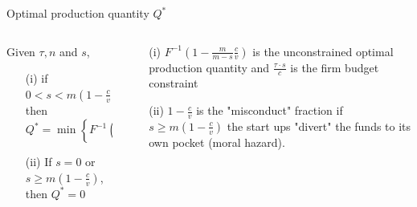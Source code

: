\documentclass{beamer}
\begin{document}
\begin{frame}{Optimal production quantity $Q^\ast$}
\scriptsize
\begin{columns}
\begin{column}{0.5\textwidth}
\begin{tcolorbox}[enhanced,drop shadow, title=Proposition ]
Given $\tau , n $ and $s$, 
\begin{itemize}
  \item[(i)] if $0<s < m\left(1-\frac{c}{v}\right)$ then 
  $$
  Q^{\ast} = \min\left\{F^{-1}\left(1-\frac{m}{m-s}\frac{c}{v}\right), \frac{\tau \cdot s}{c}\right\}
  $$ 
  \item[(ii)] If $s = 0$ or $s\geq m\left(1-\frac{c}{v}\right)$, then $Q^\ast = 0$
\end{itemize}
\end{tcolorbox}
\end{column}
\begin{column}{0.5\textwidth}
\begin{tcolorbox}[enhanced,drop shadow, title=Interpretation ]
\begin{itemize}
  \item[(i)]  $F^{-1}\left(1-\frac{m}{m-s}\frac{c}{v}\right)$ is the unconstrained optimal production quantity and $\frac{\tau \cdot s}{c}$ is the firm budget constraint 

  \item[(ii)] $1-\frac{c}{v}$ is the "misconduct" fraction if $s\geq m\left(1-\frac{c}{v}\right)$  
  the start ups "divert" the funds to its own pocket (moral hazard).
\end{itemize}
\end{tcolorbox}
\end{column}
\end{columns}
\end{frame}
\end{document}
